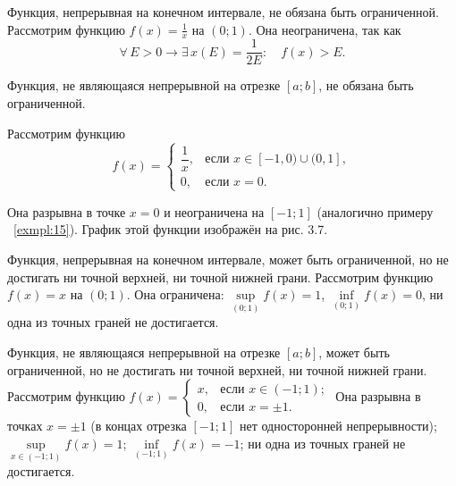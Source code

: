 
\begin{exmpl} \label{exmpl:15}
    Функция, непрерывная на конечном интервале, не обязана быть ограниченной. Рассмотрим функцию $f(x) = \frac{1}{x}$ на $(0; 1)$. Она неограничена, так как
$$
\forall\, E > 0 \to \exists\, x(E) = \frac{1}{2E} \colon \quad f(x) > E.
$$
\end{exmpl} 

\begin{exmpl} 
Функция, не являющаяся непрерывной на отрезке $[a; b]$, не обязана быть ограниченной.

Рассмотрим функцию
\[%
f(x)=\begin{cases}
\dfrac{1}{x}, & \text{если } x\in[-1,0)\cup(0,1],\\
0, & \text{если } x=0.
\end{cases}
\]

Она разрывна в точке $x=0$ и неограничена на $[-1;1]$ (аналогично примеру ~\ref{exmpl:15}). График этой функции изображён на рис. 3.7.

\end{exmpl} 

\begin{exmpl} 
Функция, непрерывная на конечном интервале, может быть ограниченной, но не достигать ни точной верхней, ни точной нижней грани. Рассмотрим функцию $f(x) = x$ на $(0; 1)$. Она ограничена: $\sup\limits_{(0; 1)} f(x) = 1$, $\inf\limits_{(0; 1)} f(x) = 0$, ни одна из точных граней не достигается. 
\end{exmpl}

\begin{exmpl}
    Функция, не являющаяся непрерывной на отрезке $[a; b]$, может быть ограниченной, но не достигать ни точной верхней, ни точной нижней грани. Рассмотрим функцию 
$f(x) = 
\begin{cases} 
x, & \text{если } x \in (-1; 1); \\ 
0, & \text{если } x = \pm 1. 
\end{cases}$ 
Она разрывна в точках $x = \pm 1$ (в концах отрезка $[-1; 1]$ нет односторонней непрерывности); $\sup\limits_{x \in (-1; 1)} f(x) = 1$; $\inf\limits_{(-1; 1)} f(x) = -1$; ни одна из точных граней не достигается.
\end{exmpl}